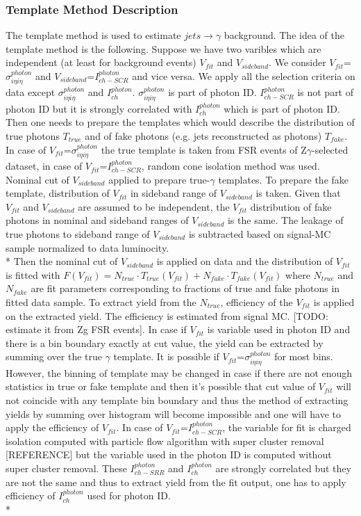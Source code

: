 \subsubsection{Template Method Description}
The template method is used to estimate $jets \rightarrow \gamma$ background. The idea of the template method is the following. Suppose we have two varibles which are independent (at least for background events) $V_{fit}$ and $V_{sideband}$. We consider $V_{fit}$=$\sigma_{i \eta i \eta}^{photon}$ and $V_{sideband}$=$I_{ch-SCR}^{photon}$ and vice versa. 
We apply all the selection criteria on data except $\sigma_{i \eta i \eta}^{photon}$ and $I_{ch}^{photon}$. $\sigma_{i \eta i \eta}^{photon}$ is part of photon ID. $I_{ch-SCR}^{photon}$ is not part of photon ID but it is strongly correlated with $I_{ch}^{photon}$ which is part of photon ID. Then one needs to prepare the templates which would describe the distribution of true photons $T_{true}$ and of fake photons (e.g. jets reconstructed as photons) $T_{fake}$. In case of $V_{fit}$=$\sigma_{i \eta i \eta}^{photon}$ the true template is taken from FSR events of Z$\gamma$-selected dataset, in case of $V_{fit}$=$I_{ch-SCR}^{photon}$, random cone isolation method was used. Nominal cut of $V_{sideband}$ applied to prepare true-$\gamma$ templates. To prepare the fake template, distribution of $V_{fit}$ in sideband range of  $V_{sideband}$ is taken. Given that  $V_{fit}$ and $V_{sideband}$ are assumed to be independent, the $V_{fit}$ distribution of fake photons in nominal and sideband ranges of $V_{sideband}$ is the same. The leakage of true photons to sideband range of $V_{sideband}$ is subtracted based on signal-MC sample normalized to data luminocity.\\*
Then the nominal cut of  $V_{sideband}$ is applied on data and the distribution of $V_{fit}$ is fitted with $F(V_{fit})=N_{true} \cdot T_{true}(V_{fit}) + N_{fake} \cdot T_{fake}(V_{fit})$ where $N_{true}$ and $N_{fake}$ are fit parameters corresponding to fractions of true and fake photons in fitted data sample. To extract yield from the $N_{true}$, efficiency of the $V_{fit}$ is applied on the extracted yield. The efficiency is estimated from signal MC. [TODO: estimate it from Zg FSR events]. In case if $V_{fit}$ is variable used in photon ID and there is a bin boundary exactly at cut value, the yield can be extracted by summing over the true $\gamma$ template. It is possible if $V_{fit}$=$\sigma_{i \eta i \eta}^{photon}$ for most bins. However, the binning of template may be changed in case if there are not enough statistics in true or fake template and then it's possible that cut value of $V_{fit}$ will not coincide with any template bin boundary and thus the method of extracting yields by summing over histogram will become impossible and one will have to apply the efficiency of $V_{fit}$. In case of $V_{fit}$=$I_{ch-SCR}^{photon}$, the variable for fit is charged isolation computed with particle flow algorithm with super cluster removal [REFERENCE] but the variable used in the photon ID is computed without super cluster removal. These $I_{ch-SRR}^{photon}$ and $I_{ch}^{photon}$ are strongly correlated but they are not the same and thus to extract yield from the fit output, one has to apply efficiency of  $I_{ch}^{photon}$  used for photon ID.\\*
